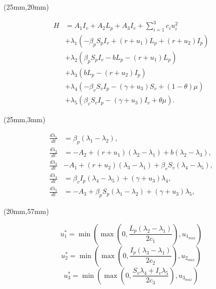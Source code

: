 \begin{frame}
		\begin{textblock*}{80mm}(25mm,20mm)
			\begin{greenbox}{}
				\begin{align*}
					H&=A_1I_v+A_2L_p+A_3I_v+\sum_{i=1}^{3}c_iu_i^2\\
					&+\lambda_1(-\beta_p S_p I_v +(r +u_1)L_p + (r + u_2) I_p)\\
					&+\lambda_2(\beta_p S_p I_v -b L_p -(r + u_1)L_p)\\
					&+\lambda_3(b L_p - (r + u_2) I_p)\\
					&+\lambda_4(-\beta_v S_v I_p - (\gamma+u_3) S_v +(1-\theta)\mu)\\
					&+\lambda_5(\beta_v S_v I_p -(\gamma+u_3) I_v +\theta\mu).
				\end{align*}
			\end{greenbox}
		\end{textblock*}
\end{frame}


\begin{frame}[plain]
	\begin{textblock*}{80mm}(25mm,3mm)
		\begin{greenbox}{}
			\begin{align*}
			\frac{d\lambda_1}{dt} &=\beta_p (\lambda_1-\lambda_2),\\
			\frac{d\lambda_2}{dt} &=-A_2+(r+u_1)(\lambda_2-\lambda_1)+b(\lambda_2-\lambda_3),\\
			\frac{d\lambda_3}{dt} &-A_1+(r+u_2)(\lambda_3-\lambda_1)+\beta_vS_v(\lambda_4-\lambda_5),\\
			\frac{d\lambda_4}{dt} &=\beta_v I_p(\lambda_4-\lambda_5)+(\gamma+u_3)\lambda_4,\\
			\frac{d\lambda_5}{dt} &=-A_3+\beta_p S_p(\lambda_1-\lambda_2)+(\gamma+u_3)\lambda_5,				
			\end{align*}
		\end{greenbox}	
	\end{textblock*}
	
	\begin{textblock*}{90mm}(20mm,57mm)
		\begin{yellowbox}{}
			$$u_1^*=\min\left(\max\left(0,\frac{L_p(\lambda_2-\lambda_1)}{2c_1}\right),u_{1_{max}}\right)$$
			$$u_2^*=\min\left(\max\left(0,\frac{I_p(\lambda_3-\lambda_1)}{2c_2}\right),u_{2_{max}}\right)$$
			$$u_3^*=\min\left(\max\left(0,\frac{S_v\lambda_4+I_v\lambda_5}{2c_3}\right),u_{3_{max}}\right)$$
		\end{yellowbox}
		
	\end{textblock*}
	
\end{frame}
